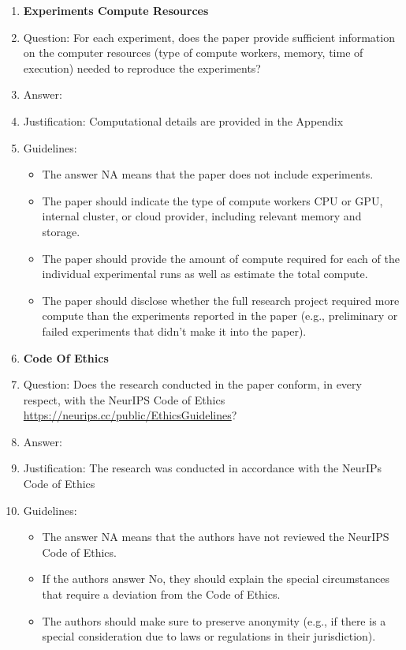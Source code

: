 \documentclass{article}
\begin{document}
\begin{enumerate}
\item {\bf Experiments Compute Resources}
    \item[] Question: For each experiment, does the paper provide sufficient information on the computer resources (type of compute workers, memory, time of execution) needed to reproduce the experiments?
    \item[] Answer: \answerYes{} %
    \item[] Justification: Computational details are provided in the Appendix
    \item[] Guidelines:
    \begin{itemize}
        \item The answer NA means that the paper does not include experiments.
        \item The paper should indicate the type of compute workers CPU or GPU, internal cluster, or cloud provider, including relevant memory and storage.
        \item The paper should provide the amount of compute required for each of the individual experimental runs as well as estimate the total compute. 
        \item The paper should disclose whether the full research project required more compute than the experiments reported in the paper (e.g., preliminary or failed experiments that didn't make it into the paper). 
    \end{itemize}
    
\item {\bf Code Of Ethics}
    \item[] Question: Does the research conducted in the paper conform, in every respect, with the NeurIPS Code of Ethics \url{https://neurips.cc/public/EthicsGuidelines}?
    \item[] Answer: \answerYes{} %
    \item[] Justification: The research was conducted in accordance with the NeurIPs Code of Ethics
    \item[] Guidelines:
    \begin{itemize}
        \item The answer NA means that the authors have not reviewed the NeurIPS Code of Ethics.
        \item If the authors answer No, they should explain the special circumstances that require a deviation from the Code of Ethics.
        \item The authors should make sure to preserve anonymity (e.g., if there is a special consideration due to laws or regulations in their jurisdiction).
    \end{itemize}



\end{enumerate}
\end{document}
